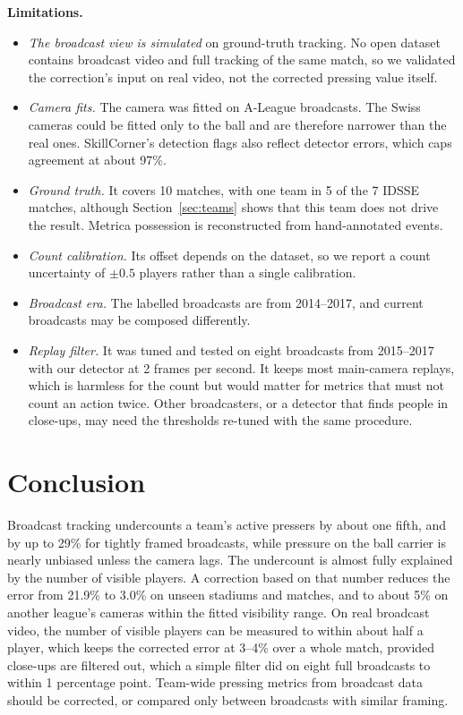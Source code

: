 \documentclass[]{interact}
\begin{document}
\textbf{Limitations.}
\begin{itemize}
\item \emph{The broadcast view is simulated} on ground-truth tracking. No open dataset contains broadcast video and
full tracking of the same match, so we validated the correction's input on real video, not the corrected pressing
value itself.
\item \emph{Camera fits.} The camera was fitted on A-League broadcasts. The Swiss cameras could be fitted only to the
ball and are therefore narrower than the real ones. SkillCorner's detection flags also reflect detector errors, which
caps agreement at about 97\%.
\item \emph{Ground truth.} It covers 10 matches, with one team in 5 of the 7 IDSSE matches, although
Section~\ref{sec:teams} shows that this team does not drive the result. Metrica possession is reconstructed from
hand-annotated events.
\item \emph{Count calibration.} Its offset depends on the dataset, so we report a count uncertainty of
$\pm 0.5$ players rather than a single calibration.
\item \emph{Broadcast era.} The labelled broadcasts are from 2014--2017, and current broadcasts may be composed
differently.
\item \emph{Replay filter.} It was tuned and tested on eight broadcasts from 2015--2017 with our detector at 2
frames per second. It keeps most main-camera replays, which is harmless for the count but would matter for metrics
that must not count an action twice. Other broadcasters, or a detector that finds people in close-ups, may need the
thresholds re-tuned with the same procedure.
\end{itemize}

\section{Conclusion}

Broadcast tracking undercounts a team's active pressers by about one fifth, and by up to 29\% for tightly framed
broadcasts, while pressure on the ball carrier is nearly unbiased unless the camera lags. The undercount is almost
fully explained by the number of visible players. A correction based on that number reduces the error from 21.9\% to
3.0\% on unseen stadiums and matches, and to about 5\% on another league's cameras within the fitted visibility
range. On real broadcast video, the number of visible players can be measured to within about half a player, which
keeps the corrected error at 3--4\% over a whole match, provided close-ups are filtered out, which a simple filter
did on eight full broadcasts to within 1 percentage point. Team-wide pressing metrics from broadcast data should be
corrected, or compared only between broadcasts with similar framing.
\end{document}
